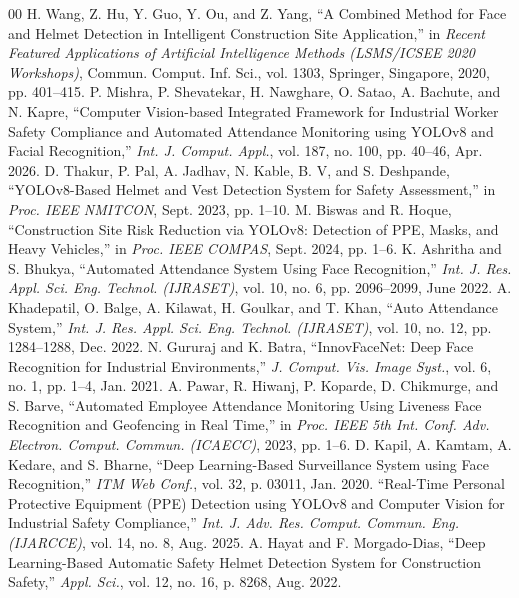 \documentclass[conference]{IEEEtran}
\begin{document}
\begin{thebibliography}{00}
 H. Wang, Z. Hu, Y. Guo, Y. Ou, and Z. Yang, ``A Combined Method for Face and Helmet Detection in Intelligent Construction Site Application,'' in \textit{Recent Featured Applications of Artificial Intelligence Methods (LSMS/ICSEE 2020 Workshops)}, Commun. Comput. Inf. Sci., vol. 1303, Springer, Singapore, 2020, pp. 401--415.
 P. Mishra, P. Shevatekar, H. Nawghare, O. Satao, A. Bachute, and N. Kapre, ``Computer Vision-based Integrated Framework for Industrial Worker Safety Compliance and Automated Attendance Monitoring using YOLOv8 and Facial Recognition,'' \textit{Int. J. Comput. Appl.}, vol. 187, no. 100, pp. 40--46, Apr. 2026.
 D. Thakur, P. Pal, A. Jadhav, N. Kable, B. V, and S. Deshpande, ``YOLOv8-Based Helmet and Vest Detection System for Safety Assessment,'' in \textit{Proc. IEEE NMITCON}, Sept. 2023, pp. 1--10.
 M. Biswas and R. Hoque, ``Construction Site Risk Reduction via YOLOv8: Detection of PPE, Masks, and Heavy Vehicles,'' in \textit{Proc. IEEE COMPAS}, Sept. 2024, pp. 1--6.
 K. Ashritha and S. Bhukya, ``Automated Attendance System Using Face Recognition,'' \textit{Int. J. Res. Appl. Sci. Eng. Technol. (IJRASET)}, vol. 10, no. 6, pp. 2096--2099, June 2022.
 A. Khadepatil, O. Balge, A. Kilawat, H. Goulkar, and T. Khan, ``Auto Attendance System,'' \textit{Int. J. Res. Appl. Sci. Eng. Technol. (IJRASET)}, vol. 10, no. 12, pp. 1284--1288, Dec. 2022.
 N. Gururaj and K. Batra, ``InnovFaceNet: Deep Face Recognition for Industrial Environments,'' \textit{J. Comput. Vis. Image Syst.}, vol. 6, no. 1, pp. 1--4, Jan. 2021.
 A. Pawar, R. Hiwanj, P. Koparde, D. Chikmurge, and S. Barve, ``Automated Employee Attendance Monitoring Using Liveness Face Recognition and Geofencing in Real Time,'' in \textit{Proc. IEEE 5th Int. Conf. Adv. Electron. Comput. Commun. (ICAECC)}, 2023, pp. 1--6.
 D. Kapil, A. Kamtam, A. Kedare, and S. Bharne, ``Deep Learning-Based Surveillance System using Face Recognition,'' \textit{ITM Web Conf.}, vol. 32, p. 03011, Jan. 2020.
 ``Real-Time Personal Protective Equipment (PPE) Detection using YOLOv8 and Computer Vision for Industrial Safety Compliance,'' \textit{Int. J. Adv. Res. Comput. Commun. Eng. (IJARCCE)}, vol. 14, no. 8, Aug. 2025.
 A. Hayat and F. Morgado-Dias, ``Deep Learning-Based Automatic Safety Helmet Detection System for Construction Safety,'' \textit{Appl. Sci.}, vol. 12, no. 16, p. 8268, Aug. 2022.

\end{thebibliography}
\end{document}
